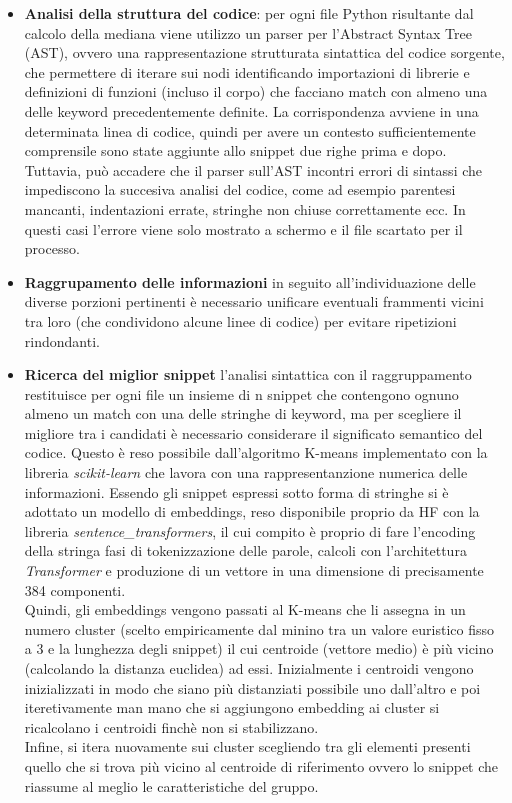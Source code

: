 \documentclass{article}
\begin{document}
\begin{itemize}
    \item \textbf{Analisi della struttura del codice}: per ogni file Python risultante dal calcolo della mediana viene utilizzo un parser per l'Abstract Syntax Tree (AST), ovvero una rappresentazione strutturata sintattica del codice sorgente, che permettere di iterare sui nodi identificando importazioni di librerie e definizioni di funzioni (incluso il corpo) che facciano match con almeno una delle keyword precedentemente definite. La corrispondenza avviene in una determinata linea di codice, quindi per avere un contesto sufficientemente comprensile sono state aggiunte allo snippet due righe prima e dopo.\\
    Tuttavia, può accadere che il parser sull'AST incontri errori di sintassi che impediscono la succesiva analisi del codice, come ad esempio parentesi mancanti, indentazioni errate, stringhe non chiuse correttamente ecc. In questi casi l'errore viene solo mostrato a schermo e il file scartato per il processo.
    
    \item \textbf{Raggrupamento delle informazioni} in seguito all'individuazione delle diverse porzioni pertinenti è necessario unificare eventuali frammenti vicini tra loro (che condividono alcune linee di codice) per evitare ripetizioni rindondanti. 

    \item \textbf{Ricerca del miglior snippet} l'analisi sintattica con il raggruppamento restituisce per ogni file un insieme di n snippet che contengono ognuno almeno un match con una delle stringhe di keyword, ma per scegliere il migliore tra i candidati è necessario considerare il significato semantico del codice.
    Questo è reso possibile dall'algoritmo K-means implementato con la libreria \textit{scikit-learn} che lavora con una rappresentanzione numerica delle informazioni. Essendo gli snippet espressi sotto forma di stringhe si è adottato un modello di embeddings, reso disponibile proprio da HF con la libreria \textit{sentence\_transformers}, il cui compito è proprio di fare l'encoding della stringa fasi di  tokenizzazione delle parole, calcoli con l'architettura \textit{Transformer} e produzione di un vettore in una dimensione di precisamente 384 componenti.\\
    Quindi, gli embeddings vengono passati al K-means che li assegna in un numero cluster (scelto empiricamente dal minino tra un valore euristico fisso a 3 e la lunghezza degli snippet) il cui centroide (vettore medio) è più vicino (calcolando la distanza euclidea) ad essi. Inizialmente i centroidi vengono inizializzati in modo che siano più distanziati possibile uno dall'altro e poi iteretivamente man mano che si aggiungono embedding ai cluster si ricalcolano i centroidi finchè non si stabilizzano.\\
    Infine, si itera nuovamente sui cluster scegliendo tra gli elementi presenti quello che si trova più vicino al centroide di riferimento ovvero lo snippet che riassume al meglio le caratteristiche del gruppo.


\end{itemize}
\end{document}

